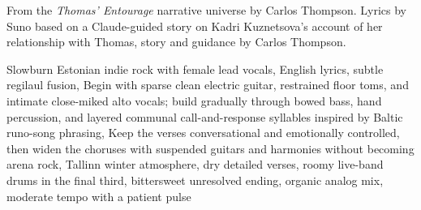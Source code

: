 
\begin{notes}
From the \emph{Thomas' Entourage} narrative universe by Carlos Thompson. Lyrics by Suno based on a Claude-guided story on Kadri Kuznetsova's account of her relationship with Thomas, story and guidance by Carlos Thompson.
\end{notes}
\begin{style}
Slowburn Estonian indie rock with female lead vocals, English lyrics, subtle regilaul fusion, Begin with sparse clean electric guitar, restrained floor toms, and intimate close-miked alto vocals; build gradually through bowed bass, hand percussion, and layered communal call-and-response syllables inspired by Baltic runo-song phrasing, Keep the verses conversational and emotionally controlled, then widen the choruses with suspended guitars and harmonies without becoming arena rock, Tallinn winter atmosphere, dry detailed verses, roomy live-band drums in the final third, bittersweet unresolved ending, organic analog mix, moderate tempo with a patient pulse
\end{style}
